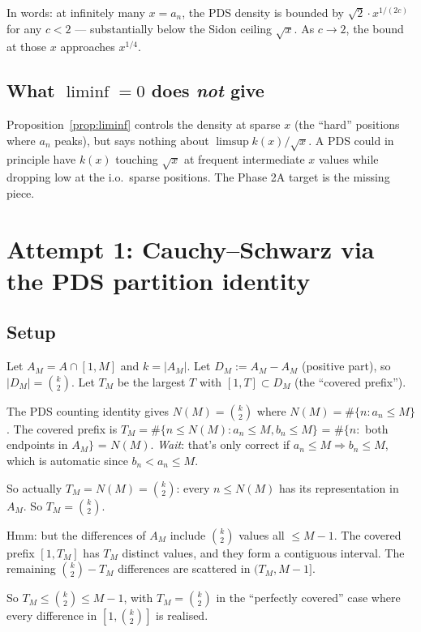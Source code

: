 \documentclass[11pt]{article}
\begin{document}
In words: at infinitely many $x = a_n$, the PDS density is bounded by
$\sqrt 2 \cdot x^{1/(2c)}$ for any $c < 2$ --- substantially below the
Sidon ceiling $\sqrt x$. As $c \to 2$, the bound at those $x$ approaches
$x^{1/4}$.

\subsection{What $\liminf = 0$ does \emph{not} give}

Proposition~\ref{prop:liminf} controls the density at sparse $x$
(the ``hard'' positions where $a_n$ peaks), but says nothing about
$\limsup k(x)/\sqrt x$. A PDS could in principle have $k(x)$ touching
$\sqrt x$ at frequent intermediate $x$ values while dropping low at the
i.o.\ sparse positions. The Phase 2A target is the missing piece.

\section{Attempt 1: Cauchy--Schwarz via the PDS partition identity}

\subsection{Setup}

Let $A_M = A \cap [1, M]$ and $k = |A_M|$. Let $D_M := A_M - A_M$
(positive part), so $|D_M| = \binom{k}{2}$. Let $T_M$ be the largest $T$
with $[1, T] \subset D_M$ (the ``covered prefix'').

The PDS counting identity gives $N(M) = \binom{k}{2}$ where
$N(M) = \#\{n : a_n \leq M\}$. The covered prefix is
$T_M = \#\{n \leq N(M) : a_n \leq M, b_n \leq M\}$ = $\#\{n: $ both endpoints in $A_M\}$ = $N(M)$. \emph{Wait}: that's only correct if $a_n \leq M \Rightarrow b_n \leq M$, which is automatic since $b_n < a_n \leq M$.

So actually $T_M = N(M) = \binom{k}{2}$: every $n \leq N(M)$ has its
representation in $A_M$. So $T_M = \binom{k}{2}$.

Hmm: but the differences of $A_M$ include $\binom{k}{2}$ values all $\leq
M - 1$. The covered prefix $[1, T_M]$ has $T_M$ distinct values, and they
form a contiguous interval. The remaining $\binom{k}{2} - T_M$ differences
are scattered in $(T_M, M-1]$.

So $T_M \leq \binom{k}{2} \leq M - 1$, with $T_M = \binom{k}{2}$
in the ``perfectly covered'' case where every difference in
$[1, \binom{k}{2}]$ is realised.
\end{document}
